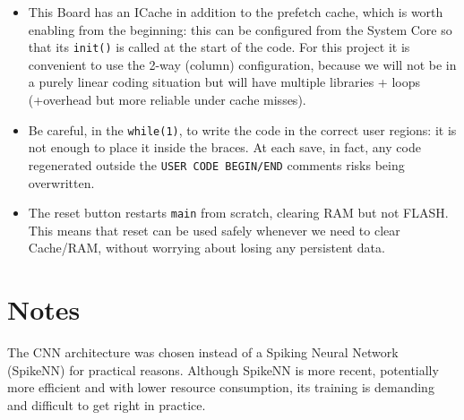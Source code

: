 \begin{itemize}
    \item This Board has an ICache in addition to the prefetch cache, which is worth enabling from the beginning: this can be configured from the System Core so that its \texttt{init()} is called at the start of the code. For this project it is convenient to use the 2-way (column) configuration, because we will not be in a purely linear coding situation but will have multiple libraries + loops (+overhead but more reliable under cache misses).
    \item Be careful, in the \texttt{while(1)}, to write the code in the correct user regions: it is not enough to place it inside the braces. At each save, in fact, any code regenerated outside the \texttt{USER CODE BEGIN/END} comments risks being overwritten.
    \item The reset button restarts \texttt{main} from scratch, clearing RAM but not FLASH. This means that reset can be used safely whenever we need to clear Cache/RAM, without worrying about losing any persistent data.
\end{itemize}

\section*{Notes}

The CNN architecture was chosen instead of a Spiking Neural Network (SpikeNN) for practical reasons. Although SpikeNN is more recent, potentially more efficient and with lower resource consumption, its training is demanding and difficult to get right in practice.


